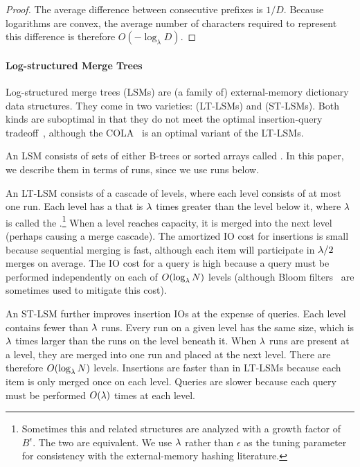 \begin{proof}
	The average difference between consecutive prefixes is $1/D$. Because
	logarithms are convex, the average number of characters required to
	represent this difference is therefore $O(-\log_\lambda{D})$.
\end{proof}

\paragraph{Log-structured Merge Trees}\label{sec:lsm}
Log-structured merge trees (LSMs) are (a family of) external-memory dictionary
data structures.  They come in two varieties: 
(LT-LSMs) and  (ST-LSMs).  Both kinds are suboptimal in
that they do not meet the optimal insertion-query
tradeoff~\cite{DBLP:conf/soda/BrodalF03}, although the
COLA~\cite{DBLP:conf/spaa/BenderFFFKN07} is an optimal variant of the LT-LSMs.

An LSM consists of sets of either B-trees or sorted arrays called .
In this paper, we describe them in terms of runs, since we use runs below.

An LT-LSM consists of a cascade of levels, where each level consists
of at most one run.  Each level has a  that is $\lambda$
times greater than the level below it, where $\lambda$ is called the
.\footnote{Sometimes this and related structures
  are analyzed with a growth factor of $B^\epsilon$. The two are
  equivalent. We use $\lambda$ rather than $\epsilon$ as the tuning
  parameter for consistency with the external-memory hashing
  literature.}  When a level reaches capacity, it is merged into the
next level (perhaps causing a merge cascade).  The amortized IO cost
for insertions is small because sequential merging is fast, although
each item will participate in $\lambda/2$ merges on average.  The IO
cost for a query is high because a query must be performed independently
on each of $O(\log_\lambda N)$ levels (although Bloom
filters~\cite{DBLP:journals/cacm/Bloom70,DBLP:journals/pvldb/BenderFJKKMMSSZ12}
are sometimes used to mitigate this cost).

An ST-LSM further improves insertion IOs at the expense of queries.
Each level contains fewer than $\lambda$ runs.  Every run on a given
level has the same size, which is $\lambda$ times larger than the runs
on the level beneath it.  When $\lambda$ runs are present at a level,
they are merged into one run and placed at the next level.  There are
therefore $O(\log_{\lambda} N)$ levels.  Insertions are faster than in
LT-LSMs because each item is only merged once on each level.  Queries
are slower because each query must be performed $O(\lambda)$ times at each
level.

